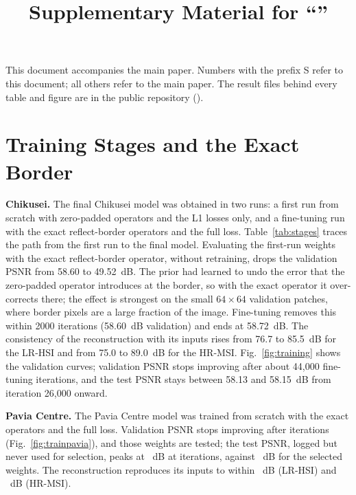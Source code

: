 \documentclass[journal]{IEEEtran}
\begin{document}
\title{Supplementary Material for ``\papertitle''}
\author{\paperauthor}
\maketitle

This document accompanies the main paper. Numbers with the prefix S refer to this document; all others refer to the main paper. The result files behind every table and figure are in the public repository (\repourl).

\section{Training Stages and the Exact Border}
\label{sec:s-stages}
\textbf{Chikusei.} The final Chikusei model was obtained in two runs: a first run from scratch with zero-padded operators and the L1 losses only, and a fine-tuning run with the exact reflect-border operators and the full loss. Table~\ref{tab:stages} traces the path from the first run to the final model. Evaluating the first-run weights with the exact reflect-border operator, without retraining, drops the validation PSNR from 58.60 to 49.52~dB. The prior had learned to undo the error that the zero-padded operator introduces at the border, so with the exact operator it over-corrects there; the effect is strongest on the small $64\times64$ validation patches, where border pixels are a large fraction of the image. Fine-tuning removes this within 2000 iterations (58.60~dB validation) and ends at 58.72~dB. The consistency of the reconstruction with its inputs rises from 76.7 to 85.5~dB for the LR-HSI and from 75.0 to 89.0~dB for the HR-MSI. Fig.~\ref{fig:training} shows the validation curves; validation PSNR stops improving after about 44{,}000 fine-tuning iterations, and the test PSNR stays between 58.13 and 58.15~dB from iteration 26{,}000 onward.

\textbf{Pavia Centre.} The Pavia Centre model was trained from scratch with the exact operators and the full loss. Validation PSNR stops improving after  iterations (Fig.~\ref{fig:trainpavia}), and those weights are tested; the test PSNR, logged but never used for selection, peaks at ~dB at  iterations, against ~dB for the selected weights. The reconstruction reproduces its inputs to within ~dB (LR-HSI) and ~dB (HR-MSI).
\end{document}
